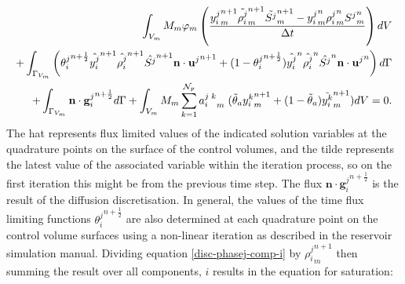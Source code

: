 \begin{eqnarray}
\int_{V_m} M_m \phi_m \left( \frac{ {y_{i}^{j}}_m^{n+1}
\tilde{\rho_i^{j}}_m^{n+1} \tilde{S^{j}}_m^{n+1}  -
{y_{i}^{j}}_m^n {\rho_i^{j}}_m^n {S^{j}}_m^n   } 
{\Delta t} \right) dV \\
+
\int_{\Gamma_{V_m}} \left( {\theta_i^j}^{n+\frac{1}{2}}  \hat{y_{i}^{j}}^{n+1} 
\hat{\rho_i^{j}}^{n+1} \hat{S^{j}}^{n+1} \mathbf{n}\cdot{\mathbf{u}^{j}}^{n+1}
+(1-{\theta_i^j}^{n+\frac{1}{2}}) \hat{y_{i}^{j}}^n  
\hat{\rho_i^{j}}^n \hat{S^{j}}^n \mathbf{n}\cdot{\mathbf{u}^{j}}^n \right)  d\Gamma \\
+ \int_{\Gamma_{V_m}}  \mathbf{n}\cdot{\mathbf{g}_i^{j}}^{n+\frac{1}{2}}d\Gamma
+ \int_{V_m} M_m \sum_{k=1}^{{\cal N}_p} {a_i^{j\;k}}_m \; 
(\tilde\theta_a {y_i^k}_m^{n+1} +(1-\tilde\theta_a) \tilde{y_i^k}_m^{n+1}) dV  = 0. 
\label{disc-phasej-comp-i}
\end{eqnarray}
The hat represents flux limited values of the indicated solution variables at  the quadrature points on the surface of the control volumes, and the tilde  represents the latest value of the associated variable within the iteration  process, so on the first iteration this might be from the previous time step. The flux 
$\mathbf{n}\cdot{\mathbf{g}_i^{j}}^{n+\frac{1}{2}}$ is the result of 
the diffusion discretisation. 
In general, the values of the time flux limiting functions  ${\theta_i^j}^{n+\frac{1}{2}}$ are also determined at each quadrature point on  the control volume surfaces using a non-linear iteration as described in the  reservoir simulation manual. Dividing equation \ref{disc-phasej-comp-i} by ${\rho_i^{j}}_m^{n+1}$ then summing the result over all components, $i$ results in the equation for saturation: 



